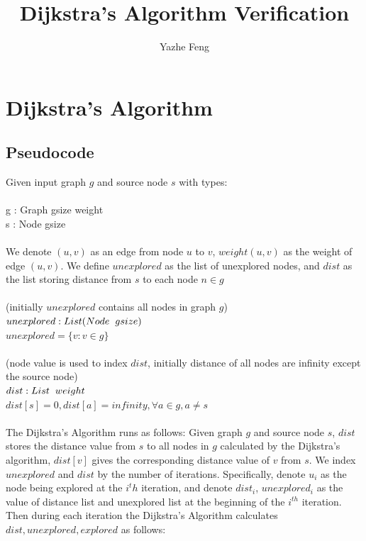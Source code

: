 \documentclass[11pt, oneside]{article}   	%
\title{Dijkstra's Algorithm Verification}
\author{Yazhe Feng}
\newcommand\tab[1][1cm]{\hspace*{#1}}
\newcommand\tsp[1][0.2cm]{\hspace*{#1}}
\theoremstyle{definition}
\begin{document}
\maketitle

\section{Dijkstra's Algorithm}

\subsection{Pseudocode}
Given input graph $g$ and source node $s$ with types:
\\\\
  \tab g : Graph gsize weight\\
  \tab s : Node gsize
\\\\
We denote $(u, v)$ as an edge from node $u$ to $v$, $weight(u, v)$ as the weight of edge $(u, v)$. We define $unexplored$ as the list of unexplored nodes, and $dist$ as the list storing distance from $s$ to each node $n \in g$
\\\\
\tab (initially $unexplored$ contains all nodes in graph $g$)\\
\tab $unexplored : List (Node \tsp gsize)$\\
\tab $unexplored = \{v : v \in g\}$
\\\\
\tab (node value is used to index $dist$, initially distance of all nodes are infinity except 
\\ \tab the source node)\\
\tab $dist : List \tsp weight$ \\
\tab $dist[s] = 0, dist[a] = infinity, \forall a \in g, a \neq s$
\\\\The Dijkstra's Algorithm runs as follows: 
Given graph $g$ and source node $s$, $dist$ stores the distance value from $s$ to all nodes in $g$ calculated by the Dijkstra's algorithm, $dist[v]$ gives the corresponding distance value of $v$ from $s$. We index $unexplored$ and $dist$ by the number of iterations. Specifically, denote $u_i$ as the node being explored at the $i^th$ iteration, and denote $dist_i$, $unexplored_i$ as the value of distance list and unexplored list at the beginning of the $i^{th}$ iteration. Then during each iteration the Dijkstra's Algorithm calculates $dist, unexplored, explored$ as follows:
\end{document}

